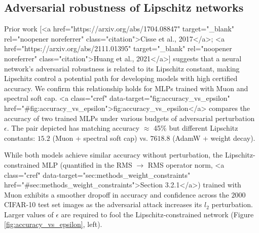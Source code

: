 \subsection{Adversarial robustness of Lipschitz networks}

Prior work [<a href="https://arxiv.org/abs/1704.08847" target="_blank" rel="noopener noreferrer" class="citation">Cisse et al., 2017</a>; <a href="https://arxiv.org/abs/2111.01395" target="_blank" rel="noopener noreferrer" class="citation">Huang et al., 2021</a>] suggests that a neural network's adversarial robustness is related to its Lipschitz constant, making Lipschitz control a potential path for developing models with high certified accuracy. We confirm this relationship holds for MLPs trained with Muon and spectral soft cap. <a class="cref" data-target="fig:accuracy_vs_epsilon" href="#fig:accuracy_vs_epsilon">fig:accuracy_vs_epsilon</a> compares the accuracy of two trained MLPs under various budgets of adversarial perturbation $\epsilon$. The pair depicted has matching accuracy $\approx$ 45\% but different Lipschitz constants: $15.2$ (Muon + spectral soft cap) vs. $7618.8$ (AdamW + weight decay).

While both models achieve similar accuracy without perturbation, the Lipschitz-constrained MLP (quantified in the RMS $\rightarrow$ RMS operator norm, <a class="cref" data-target="sec:methods_weight_constraints" href="#sec:methods_weight_constraints">Section 3.2.1</a>) trained with Muon exhibits a smoother dropoff in accuracy and confidence across the $2000$ CIFAR-10 test set images as the adversarial attack increases its $l_2$ perturbation. Larger values of $\epsilon$ are required to fool the Lipschitz-constrained network (Figure \ref{fig:accuracy_vs_epsilon}, left).

